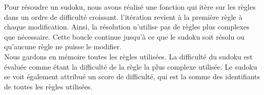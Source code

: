 \documentclass[a4paper]{article}
\begin{document}
\begin{justify}
    \qquad Pour résoudre un sudoku, nous avons réalisé une fonction qui itère sur les règles dans un ordre de difficulté croissant. l'itération revient à la première règle à chaque modification. Ainsi, la résolution n'utilise pas de règles plus complexes que nécessaire. Cette boucle continue jusqu'à ce que le sudoku soit résolu ou qu'aucune règle ne puisse le modifier. \\
    
    Nous gardons en mémoire toutes les règles utilisées. La difficulté du sudoku est évaluée comme étant la difficulté de la règle la plus complexe utilisée. Le sudoku se voit également attribué un score de difficulté, qui est la somme des identifiants de toutes les règles utilisées.
\end{justify}

\newpage
\hypertarget{canonisation}{}
\end{document}
